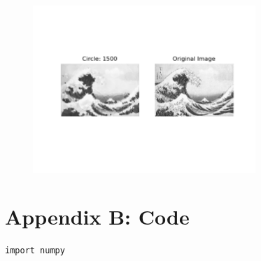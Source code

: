 \documentclass[12pt]{article}
\begin{document}
\begin{figure}[H]
\centering
\noindent\includegraphics[width=0.75\textwidth]{../results/wave/wave_1500}
\end{figure}













\newpage
\section*{Appendix B: Code}
\begin{lstlisting}
import numpy
\end{lstlisting}
\end{document}
